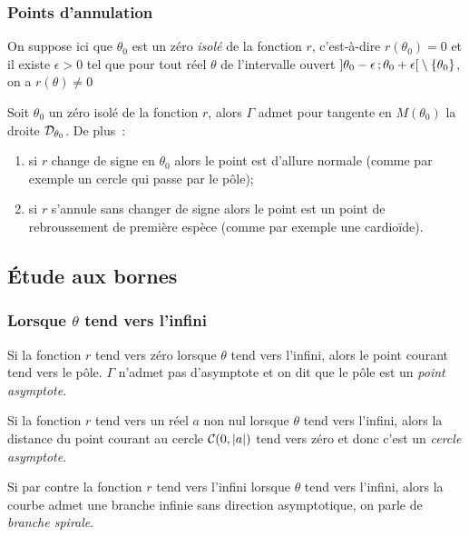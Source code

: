 \subsubsection{Points d'annulation}
On suppose ici que \(\theta_0\) est un zéro \emph{isolé} de la fonction \(r\), c'est-à-dire \(r(\theta_0)=0\) et il existe \(\epsilon >0\) tel que pour tout réel \(\theta\) de l'intervalle ouvert \(\left] \theta_0-\epsilon \, ;  \theta_0+\epsilon \right[\setminus\{\theta_0\}\), on a \(r(\theta) \neq 0\)

\begin{prop}[admise]
 Soit \(\theta_0\) un zéro isolé de la fonction \(r\), alors \(\Gamma\) admet pour tangente en \(M(\theta_0)\) la droite \(\mathcal{D}_{\theta_0}\). De plus~:
 \begin{enumerate}
 \item si \(r\) change de signe en \(\theta_0\) alors le point est d'allure normale (comme par exemple un cercle qui passe par le pôle);
 \item si \(r\) s'annule sans changer de signe alors le point est un point de rebroussement de première espèce (comme par exemple une cardioïde).
 \end{enumerate}
\end{prop}

\subsection{Étude aux bornes}
\subsubsection{Lorsque \(\theta\) tend vers l'infini}
Si la fonction \(r\) tend vers zéro lorsque \(\theta\) tend vers l'infini, alors le point courant tend vers le pôle. \(\Gamma\) n'admet pas d'asymptote et on dit que le pôle est un \emph{point asymptote}.

Si la fonction \(r\) tend vers un réel \(a\) non nul lorsque \(\theta\) tend vers l'infini, alors la distance du point courant au cercle \(\mathcal{C}(0,\left\lvert a\right\rvert)\) tend vers zéro et donc c'est un \emph{cercle asymptote}.

Si par contre la fonction \(r\) tend vers l'infini lorsque \(\theta\) tend vers l'infini, alors la courbe admet une branche infinie sans direction asymptotique, on parle de \emph{branche spirale}.

